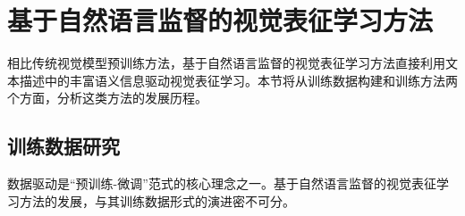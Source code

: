 
\section{基于自然语言监督的视觉表征学习方法}
\label{sec:vl-related}
相比传统视觉模型预训练方法，基于自然语言监督的视觉表征学习方法直接利用文本描述中的丰富语义信息驱动视觉表征学习。本节将从训练数据构建和训练方法两个方面，分析这类方法的发展历程。%

\subsection{训练数据研究}
数据驱动是“预训练-微调”范式的核心理念之一。基于自然语言监督的视觉表征学习方法的发展，与其训练数据形式的演进密不可分。

